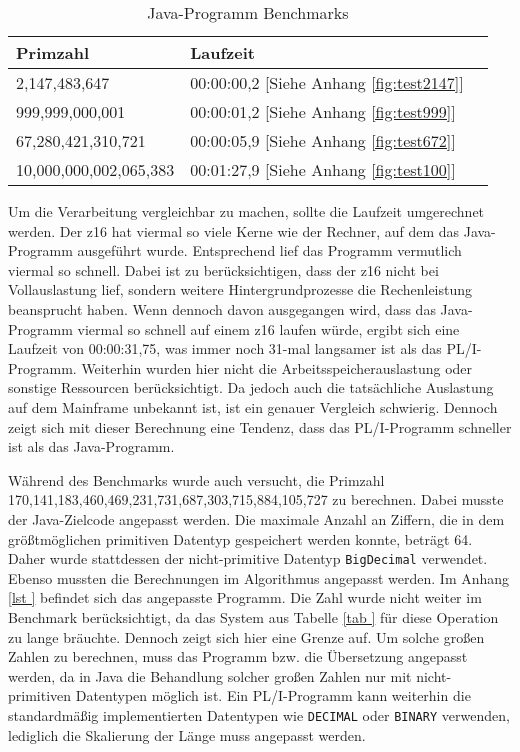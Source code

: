 \begin{table}[h]\label{tab:javabenchmark}
	\centering
	\begin{tabular}[h]{|l|l|l|}
		\hline
		\textbf{Primzahl} & \textbf{Laufzeit}  \\
		\hline
		2,147,483,647 & 00:00:00,2 [Siehe Anhang \ref{fig:test2147}]\\
		
		999,999,000,001 & 00:00:01,2  [Siehe Anhang \ref{fig:test999}]\\
		
		67,280,421,310,721 & 00:00:05,9 [Siehe Anhang \ref{fig:test672}]\\
		
		10,000,000,002,065,383 & 00:01:27,9 [Siehe Anhang \ref{fig:test100}]\\
		\hline
	\end{tabular}
	\caption{Java-Programm Benchmarks}
\end{table}

Um die Verarbeitung vergleichbar zu machen, sollte die Laufzeit umgerechnet werden.
Der z16 hat viermal so viele Kerne wie der Rechner, auf dem das Java-Programm ausgeführt wurde.
Entsprechend lief das Programm vermutlich viermal so schnell. Dabei ist zu berücksichtigen, dass der z16 nicht bei Vollauslastung lief,
sondern weitere Hintergrundprozesse die Rechenleistung beansprucht haben.
Wenn dennoch davon ausgegangen wird, dass das Java-Programm viermal so schnell auf einem z16 laufen würde, ergibt sich eine Laufzeit von 00:00:31,75,
was immer noch 31-mal langsamer ist als das PL/I-Programm. Weiterhin wurden hier nicht die Arbeitsspeicherauslastung oder sonstige Ressourcen berücksichtigt.
Da jedoch auch die tatsächliche Auslastung auf dem Mainframe unbekannt ist, ist ein genauer Vergleich schwierig.
Dennoch zeigt sich mit dieser Berechnung eine Tendenz, dass das PL/I-Programm schneller ist als das Java-Programm.

Während des Benchmarks wurde auch versucht, die Primzahl 170,141,183,460,469,231,731,687,303,715,884,105,727
zu berechnen. Dabei musste der Java-Zielcode angepasst werden. Die maximale Anzahl an Ziffern, die in dem größtmöglichen
primitiven Datentyp gespeichert werden konnte, beträgt 64. Daher wurde stattdessen der nicht-primitive Datentyp \verb+BigDecimal+
verwendet. Ebenso mussten die Berechnungen im Algorithmus angepasst werden. Im Anhang \ref{lst
} befindet sich das angepasste Programm.
Die Zahl wurde nicht weiter im Benchmark berücksichtigt, da das System aus Tabelle \ref{tab
} für diese Operation zu lange bräuchte.
Dennoch zeigt sich hier eine Grenze auf. Um solche großen Zahlen zu berechnen, muss das Programm bzw. die Übersetzung angepasst werden,
da in Java die Behandlung solcher großen Zahlen nur mit nicht-primitiven Datentypen möglich ist.
Ein PL/I-Programm kann weiterhin die standardmäßig implementierten Datentypen wie \verb+DECIMAL+ oder \verb+BINARY+ verwenden, lediglich die Skalierung der Länge muss angepasst werden.

